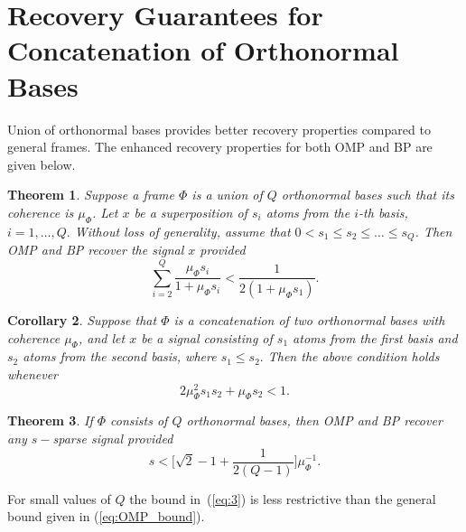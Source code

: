 \documentclass{IEEEtran}
\newtheorem{theorem}{Theorem}[section]
\newtheorem{corollary}[theorem]{Corollary}
\begin{document}
\section{Recovery Guarantees for Concatenation of Orthonormal Bases}
\label{sec:concortho}
Union of orthonormal bases provides better recovery properties compared to general frames. The enhanced recovery
properties for both OMP and BP are given below.
\begin{theorem}\cite{grib_2002}
  Suppose a frame $\Phi$ is a union of $Q$ orthonormal bases such that its coherence is
  $\mu_{\Phi}$. Let $x$ be a superposition of $s_{i}$ atoms
  from the $i$-th basis, $i = 1, \dots ,Q.$ Without loss of generality,
  assume that $0 < s_{1} \leq  s_{2} \leq \dots \leq s_{Q}$. Then OMP and BP recover the signal $x$ provided
  \begin{equation*}
    \sum^{Q}_{i=2}\frac{\mu_{\Phi}s_{i}}{1+\mu_{\Phi}s_{i}} < \frac{1}{2(1+\mu_{\Phi}s_{1})}.
  \end{equation*}
   
\end{theorem}

\begin{corollary}\cite{elad_2002}
Suppose that $\Phi$ is a concatenation of two orthonormal bases with coherence $\mu_{\Phi}$, and let $x$ be a
signal consisting of $s_1$ atoms from the first basis and $s_2$ atoms from the second basis, where $s_1 \leq s_2.$
Then the above condition holds whenever
\begin{equation*}
 2\mu^{2}_{\Phi}s_1s_2 + \mu_{\Phi}s_2 < 1.
\end{equation*}
\end{corollary}

\begin{theorem}\cite{grib_2002}
If $\Phi$ consists of $Q$ orthonormal bases, then OMP and BP recover any $s-$sparse signal provided
\begin{equation}
\label{eq:3}
s<\bigg[\sqrt{2}-1+\frac{1}{2(Q-1)}\bigg]\mu^{-1}_{\Phi}.
\end{equation}
\end{theorem}
For small values of $Q$ the bound in~(\ref{eq:3}) is
less restrictive than the general bound given in (\ref{eq:OMP_bound}).
\end{document}
